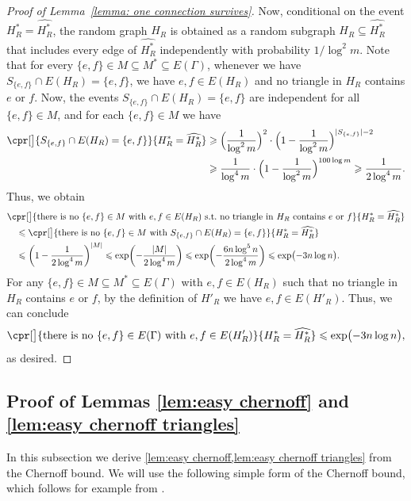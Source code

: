 \documentclass[11pt,reqno,oneside]{amsart}
\theoremstyle{definition}
\newcommand\wh[1]{\widehat{#1}}
\newcommand\1{\mathbf{1}}
\DeclarePairedDelimiter{\paren}{\lparen}{\rparen}
\newcommand{\su}{\subseteq}
\let\leq\leqslant
\let\geq\geqslant
\let\le\leqslant
\begin{document}
\begin{proof}[Proof of Lemma~\ref{lemma: one connection survives}]
Now, conditional on the event $H^*_R=\wh{H^*_R}$, the random graph $H_R$ is obtained as a random subgraph $H_R\su \wh{H^*_R}$ that includes every edge of $\wh{H^*_R}$ independently with probability $1/{\log^{2} m}$. Note that for every $\{e,f\}\in M\su M^*\su E(\Gamma)$, whenever we have $S_{\{e,f\}}\cap E(H_R)=\{e,f\}$, we have $e,f \in E(H_R)$ and no triangle in $H_R$ contains $e$ or $f$. Now, the events $S_{\{e,f\}}\cap E(H_R)=\{e,f\}$ are independent for all $\{e,f\}\in M$, and for each $\{e,f\}\in M$ we have
\begin{align*}
\cpr[\big]{S_{\{e,f\}}\cap E(H_R)=\{e,f\}}{H_R^*=\wh{H^*_R}}&\geq \Big(\frac{1}{\log^{2} m}\Big)^2\cdot \Big(1-\frac{1}{\log^{2} m}\Big)^{|S_{\{e,f\}}|-2}\\
&\geq \frac{1}{\log^{4} m}\cdot \Big(1-\frac{1}{\log^{2} m}\Big)^{100\log m}\geq \frac{1}{2\log^{4} m}.
\end{align*}
Thus, we obtain
\begin{align*} 
&\cpr[\big]{\text{there is no }\{e,f\} \in M\text{ with\ }e,f \in E(H_R)\text{ s.t.\ no triangle in }H_R\text{ contains }e\text{ or }f}{H_R^*=\wh{H^*_R}}\\
&\quad\leq \cpr[\big]{\text{there is no }\{e,f\} \in M\text{ with }S_{\{e,f\}}\cap E(H_R)=\{e,f\}}{H_R^*=\wh{H^*_R}}\\
&\quad\leq \bigg(1-\frac{1}{2\log^{4} m}\bigg)^{|M|}\leq \exp\paren[\bigg]{-\frac{|M|}{2\log^{4} m}}\leq \exp\paren[\bigg]{-\frac{6n\log^5 n}{2\log^{4} m}}\le \exp\paren[\big]{-3n\log n}.
\end{align*}
For any $\{e,f\} \in M\su M^*\su E(\Gamma)$ with $e,f \in E(H_R)$ such that no triangle in $H_R$ contains $e$ or $f$, by the definition of $H'_R$ we have $e,f \in E(H'_R)$. Thus, we can conclude
\[\cpr[\big]{\text{there is no }\{e,f\} \in E(\Gamma)\text{ with }e,f \in E(H'_R)}{H^*_R=\wh{H^*_R}}\leq \exp\paren[\big]{-3n\log n},\]
as desired.
\end{proof}

\subsection{Proof of Lemmas \ref{lem:easy chernoff} and \ref{lem:easy chernoff triangles}}\label{subsec:concentration ineqs}

In this subsection we derive \cref{lem:easy chernoff,lem:easy chernoff triangles} from the Chernoff bound.
We will use the following simple form of the Chernoff bound, which follows for example from \cite[Theorem~2.8 and eq.~(2.10)]{MR1782847}.
\end{document}
